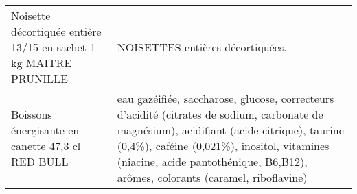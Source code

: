 \begin{longtable}{p{5cm}p{10cm}}
                                        Noisette décortiquée entière 13/15 en sachet 1 kg MAITRE PRUNILLE &                                                                                                                                                                                                                                                                                                                                                                                                                                                                                                                                                                                                                                                                                                                                                                                                                                                                                                                                                                                                         NOISETTES entières décortiquées. \\
                                                         Boissons énergisante en canette 47,3 cl RED BULL &                                                                                                                                                                                                                                                                                                                                                                                                                                                                                                                                                                                                                                                                                                                                                              eau gazéifiée, saccharose, glucose, correcteurs d'acidité (citrates de sodium, carbonate de magnésium), acidifiant (acide citrique), taurine (0,4\%), caféine (0,021\%), inositol, vitamines (niacine, acide pantothénique, B6,B12), arômes, colorants (caramel, riboflavine) \\

\end{longtable}
